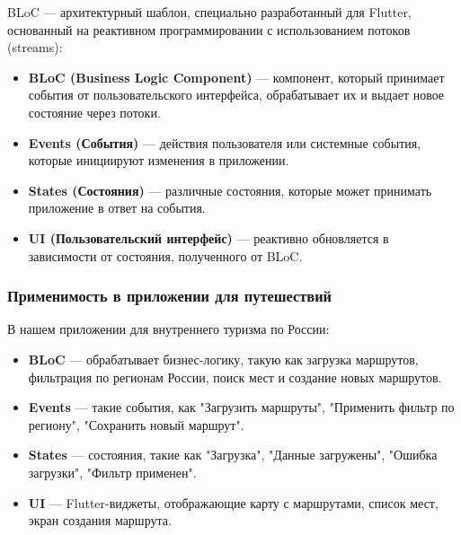 BLoC — архитектурный шаблон, специально разработанный для Flutter, основанный на реактивном программировании с использованием потоков (streams):

\begin{itemize}
    \item \textbf{BLoC (Business Logic Component)} — компонент, который принимает события от пользовательского интерфейса, обрабатывает их и выдает новое состояние через потоки.
    \item \textbf{Events (События)} — действия пользователя или системные события, которые инициируют изменения в приложении.
    \item \textbf{States (Состояния)} — различные состояния, которые может принимать приложение в ответ на события.
    \item \textbf{UI (Пользовательский интерфейс)} — реактивно обновляется в зависимости от состояния, полученного от BLoC.
\end{itemize}


\subsubsection*{Применимость в приложении для путешествий}

В нашем приложении для внутреннего туризма по России:

\begin{itemize}
    \item \textbf{BLoC} — обрабатывает бизнес-логику, такую как загрузка маршрутов, фильтрация по регионам России, поиск мест и создание новых маршрутов.
    \item \textbf{Events} — такие события, как "Загрузить маршруты", "Применить фильтр по региону", "Сохранить новый маршрут".
    \item \textbf{States} — состояния, такие как "Загрузка", "Данные загружены", "Ошибка загрузки", "Фильтр применен".
    \item \textbf{UI} — Flutter-виджеты, отображающие карту с маршрутами, список мест, экран создания маршрута.
\end{itemize}


